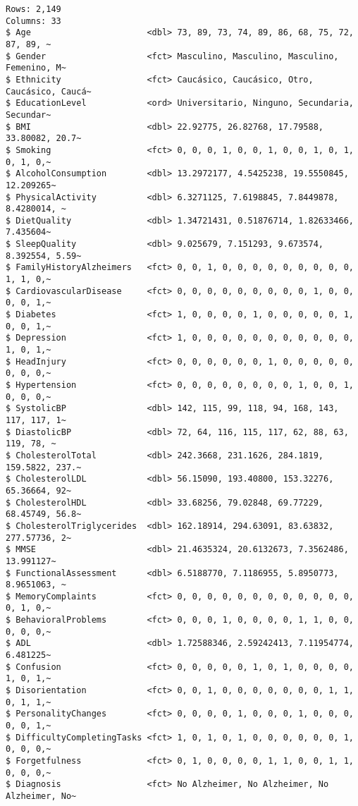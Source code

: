 \documentclass[
  letterpaper,
  DIV=11,
  numbers=noendperiod]{scrartcl}
\begin{document}
\begin{verbatim}
Rows: 2,149
Columns: 33
$ Age                       <dbl> 73, 89, 73, 74, 89, 86, 68, 75, 72, 87, 89, ~
$ Gender                    <fct> Masculino, Masculino, Masculino, Femenino, M~
$ Ethnicity                 <fct> Caucásico, Caucásico, Otro, Caucásico, Caucá~
$ EducationLevel            <ord> Universitario, Ninguno, Secundaria, Secundar~
$ BMI                       <dbl> 22.92775, 26.82768, 17.79588, 33.80082, 20.7~
$ Smoking                   <fct> 0, 0, 0, 1, 0, 0, 1, 0, 0, 1, 0, 1, 0, 1, 0,~
$ AlcoholConsumption        <dbl> 13.2972177, 4.5425238, 19.5550845, 12.209265~
$ PhysicalActivity          <dbl> 6.3271125, 7.6198845, 7.8449878, 8.4280014, ~
$ DietQuality               <dbl> 1.34721431, 0.51876714, 1.82633466, 7.435604~
$ SleepQuality              <dbl> 9.025679, 7.151293, 9.673574, 8.392554, 5.59~
$ FamilyHistoryAlzheimers   <fct> 0, 0, 1, 0, 0, 0, 0, 0, 0, 0, 0, 0, 1, 1, 0,~
$ CardiovascularDisease     <fct> 0, 0, 0, 0, 0, 0, 0, 0, 0, 1, 0, 0, 0, 0, 1,~
$ Diabetes                  <fct> 1, 0, 0, 0, 0, 1, 0, 0, 0, 0, 0, 1, 0, 0, 1,~
$ Depression                <fct> 1, 0, 0, 0, 0, 0, 0, 0, 0, 0, 0, 0, 1, 0, 1,~
$ HeadInjury                <fct> 0, 0, 0, 0, 0, 0, 1, 0, 0, 0, 0, 0, 0, 0, 0,~
$ Hypertension              <fct> 0, 0, 0, 0, 0, 0, 0, 0, 1, 0, 0, 1, 0, 0, 0,~
$ SystolicBP                <dbl> 142, 115, 99, 118, 94, 168, 143, 117, 117, 1~
$ DiastolicBP               <dbl> 72, 64, 116, 115, 117, 62, 88, 63, 119, 78, ~
$ CholesterolTotal          <dbl> 242.3668, 231.1626, 284.1819, 159.5822, 237.~
$ CholesterolLDL            <dbl> 56.15090, 193.40800, 153.32276, 65.36664, 92~
$ CholesterolHDL            <dbl> 33.68256, 79.02848, 69.77229, 68.45749, 56.8~
$ CholesterolTriglycerides  <dbl> 162.18914, 294.63091, 83.63832, 277.57736, 2~
$ MMSE                      <dbl> 21.4635324, 20.6132673, 7.3562486, 13.991127~
$ FunctionalAssessment      <dbl> 6.5188770, 7.1186955, 5.8950773, 8.9651063, ~
$ MemoryComplaints          <fct> 0, 0, 0, 0, 0, 0, 0, 0, 0, 0, 0, 0, 0, 1, 0,~
$ BehavioralProblems        <fct> 0, 0, 0, 1, 0, 0, 0, 0, 1, 1, 0, 0, 0, 0, 0,~
$ ADL                       <dbl> 1.72588346, 2.59242413, 7.11954774, 6.481225~
$ Confusion                 <fct> 0, 0, 0, 0, 0, 1, 0, 1, 0, 0, 0, 0, 1, 0, 1,~
$ Disorientation            <fct> 0, 0, 1, 0, 0, 0, 0, 0, 0, 0, 1, 1, 0, 1, 1,~
$ PersonalityChanges        <fct> 0, 0, 0, 0, 1, 0, 0, 0, 1, 0, 0, 0, 0, 0, 1,~
$ DifficultyCompletingTasks <fct> 1, 0, 1, 0, 1, 0, 0, 0, 0, 0, 0, 1, 0, 0, 0,~
$ Forgetfulness             <fct> 0, 1, 0, 0, 0, 0, 1, 1, 0, 0, 1, 1, 0, 0, 0,~
$ Diagnosis                 <fct> No Alzheimer, No Alzheimer, No Alzheimer, No~
\end{verbatim}
\end{document}
